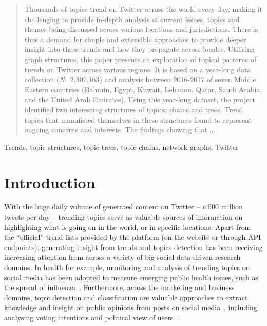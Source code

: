 \documentclass[conference]{IEEEtran}
\begin{document}
\begin{abstract}
Thousands of topics trend on Twitter across the world every day,
making it challenging to provide in-depth analysis of current issues,
topics and themes being discussed across various locations and
jurisdictions. There is thus a demand for simple and extensible
approaches to provide deeper insight into these trends and how they
propagate across locales. Utilising graph structures, this paper presents
an exploration of topical patterns of trends on Twitter across various regions. 
It is based on a year-long data collection ({\emph{N}}=2,307,163) and
analysis between 2016-2017 of seven Middle Eastern countries (Bahrain,
Egypt, Kuwait, Lebanon, Qatar, Saudi Arabia, and the United Arab
Emirates). Using this year-long dataset, the project identified two interesting 
structures of topics; chains and trees. Trend topics that manufisted themselves
in these structures found to represent ongoing concerns and interests. 
The findings showing that.... 
\end{abstract}

\begin{IEEEkeywords}
Trends, topic structures, topic-trees, topic-chains, network graphs, Twitter
\end{IEEEkeywords}

\section{Introduction}\label{intro}

With the huge daily volume of generated content on Twitter -- c.500
million tweets per day -- trending topics serve as valuable sources of
information on highlighting what is going on in the world, or in
specific locations. Apart from the ``official'' trend lists provided
by the platform (on the website or through API endpoints), generating
insight from trends and topics detection has been receiving increasing
attention from across a variety of big social data-driven research
domains. In health for example, monitoring and analysis of trending
topics on social media has been adopted to measure emerging public
health issues, such as the spread of
influenza~\cite{Achrekar2011,Parker2013,Parker2015}. Furthermore,
across the marketing and business domains, topic detection and
classification are valuable approaches to extract knowledge and
insight on public opinions from posts on social
media~\cite{blamey-et-al-2012,Bello2013,albishry-et-al:ssei2018},
including analysing voting intentions and political view of
users~\cite{Fang2015}.
\end{document}
